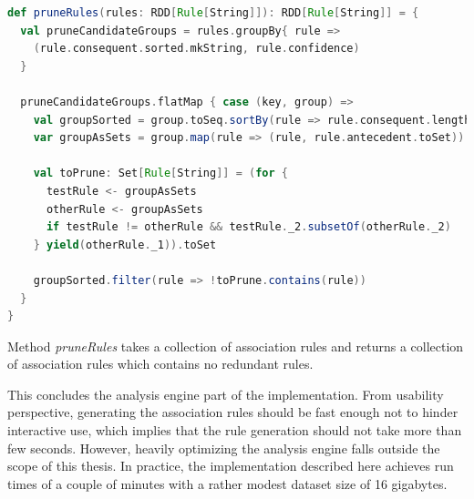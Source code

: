 \begin{minipage}{0.95\linewidth}
\begin{lstlisting}[language=scala] 
def pruneRules(rules: RDD[Rule[String]]): RDD[Rule[String]] = {
  val pruneCandidateGroups = rules.groupBy{ rule => 
    (rule.consequent.sorted.mkString, rule.confidence) 
  }

  pruneCandidateGroups.flatMap { case (key, group) =>
    val groupSorted = group.toSeq.sortBy(rule => rule.consequent.length)
    var groupAsSets = group.map(rule => (rule, rule.antecedent.toSet))

    val toPrune: Set[Rule[String]] = (for {
      testRule <- groupAsSets
      otherRule <- groupAsSets
      if testRule != otherRule && testRule._2.subsetOf(otherRule._2)
    } yield(otherRule._1)).toSet
    
    groupSorted.filter(rule => !toPrune.contains(rule))
  }
}
\end{lstlisting}
\end{minipage}       

Method \textit{pruneRules} takes a collection of association rules and returns a collection of association rules which contains no redundant rules.

This concludes the analysis engine part of the implementation. From usability perspective, generating the association rules should be fast enough not to hinder interactive use, which implies that the rule generation should not take more than few seconds. However, heavily optimizing the analysis engine falls outside the scope of this thesis. In practice, the implementation described here achieves run times of a couple of minutes with a rather modest dataset size of 16 gigabytes.


   